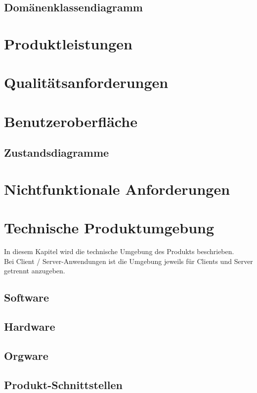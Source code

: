 	\subsection{Domänenklassendiagramm}
	
	\section{\Large Produktleistungen}
	
	\section{\Large Qualitätsanforderungen}
	
	
	\section{\Large Benutzeroberfläche}
	
	\subsection{Zustandsdiagramme}
	
	\section{\Large Nichtfunktionale Anforderungen}
	

	
	\section{\Large Technische Produktumgebung}
   	In diesem Kapitel wird die technische Umgebung des Produkts beschrieben.\\
   	Bei Client / Server-Anwendungen ist die Umgebung jeweils für Clients und Server getrennt anzugeben.
	\subsection{Software}
	
	\subsection{Hardware}
	
	\subsection{Orgware}
	
	\subsection{Produkt-Schnittstellen}

